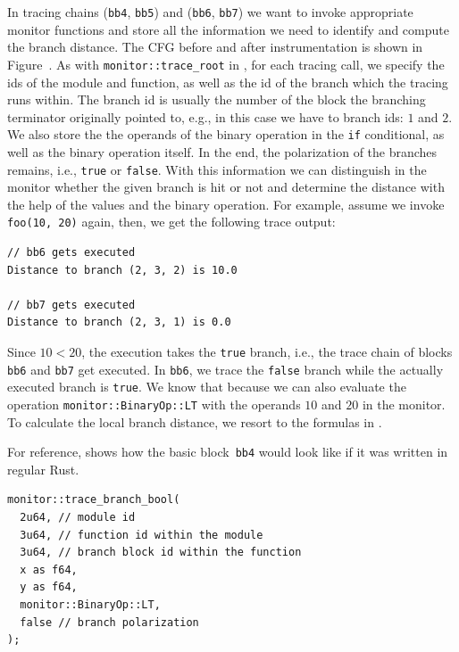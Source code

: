 \documentclass[paper=a4,%
  twoside,%
  BCOR4mm,%
  abstract=true,%
  toc=bibliography,%
  chapterprefix=true,%
  toc=bibliographynumbered,%
  open=right,%
  english,%
  pagesize=pdftex]{scrreprt}
\newcommand{\cfg}{\ac{CFG}\xspace}
\begin{document}
In tracing chains (\texttt{bb4}, \texttt{bb5}) and (\texttt{bb6}, \texttt{bb7}) we want to invoke appropriate monitor functions and store all the information we need to identify and compute the branch distance. The \cfg before and after instrumentation is shown in Figure~. As with \texttt{monitor::trace\string_root} in , for each tracing call, we specify the ids of the module and function, as well as the id of the branch which the tracing runs within. The branch id is usually the number of the block the branching terminator originally pointed to, e.g., in this case we have to branch ids: $1$ and $2$. We also store the the operands of the binary operation in the \texttt{if} conditional, as well as the binary operation itself. In the end, the polarization of the branches remains, i.e., \texttt{true} or \texttt{false}. With this information we can distinguish in the monitor whether the given branch is hit or not and determine the distance with the help of the values and the binary operation. For example, assume we invoke \texttt{foo(10, 20)} again, then, we get the following trace output:

\begin{lstlisting}[language={}, style=boxed, caption={}, label=lst:mir-instrument-branch-trace-output]
// bb6 gets executed
Distance to branch (2, 3, 2) is 10.0

// bb7 gets executed
Distance to branch (2, 3, 1) is 0.0
\end{lstlisting}

Since $10 < 20$, the execution takes the \texttt{true} branch, i.e., the trace chain of blocks \texttt{bb6} and \texttt{bb7} get executed. In \texttt{bb6}, we trace the \texttt{false} branch while the actually executed branch is \texttt{true}. We know that because we can also evaluate the operation \texttt{monitor::BinaryOp::LT} with the operands $10$ and $20$ in the monitor. To calculate the local branch distance, we resort to the formulas in .

For reference,  shows how the basic block~\texttt{bb4} would look like if it was written in regular Rust.

\begin{lstlisting}[language={}, style=boxed, caption={How would \texttt{bb4} look like in regular Rust code}, label=lst:basic-block-in-regular-rust]
monitor::trace_branch_bool(
  2u64, // module id
  3u64, // function id within the module
  3u64, // branch block id within the function
  x as f64,
  y as f64,
  monitor::BinaryOp::LT,
  false // branch polarization
);
\end{lstlisting}
\end{document}
